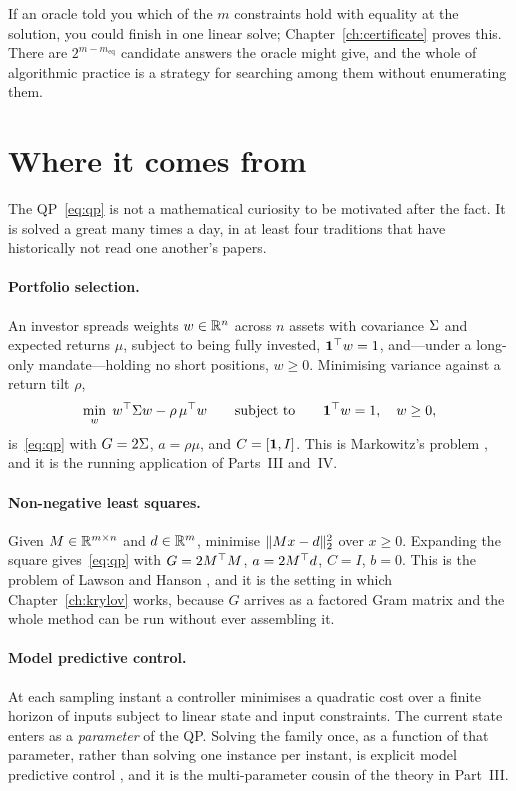 If an oracle told you which of the $m$ constraints hold with equality at the
solution, you could finish in one linear solve; Chapter~\ref{ch:certificate}
proves this. There are $2^{m-m_{\mathrm{eq}}}$ candidate answers the oracle might
give, and the whole of algorithmic practice is a strategy for searching among
them without enumerating them.

\section{Where it comes from}

The QP~\eqref{eq:qp} is not a mathematical curiosity to be motivated after the
fact. It is solved a great many times a day, in at least four traditions that
have historically not read one another's papers.

\paragraph{Portfolio selection.} An investor spreads weights $w \in \mathbb{R}^n$ across
$n$ assets with covariance $\Sigma$ and expected returns $\mu$, subject to being
fully invested, $\mathbf{1}^{\top} w = 1$, and---under a long-only mandate---holding no
short positions, $w \ge 0$. Minimising variance against a return tilt $\rho$,
\[
  \min_w \; w^{\top} \Sigma w - \rho\,\mu^{\top} w
  \qquad\text{subject to}\qquad \mathbf{1}^{\top} w = 1, \quad w \ge 0,
\]
is~\eqref{eq:qp} with $G = 2\Sigma$, $a = \rho\mu$, and $C = [\mathbf{1}, I]$. This is
Markowitz's problem \cite{markowitz1952}, and it is the running application of
Parts~III and~IV.

\paragraph{Non-negative least squares.} Given $M \in \mathbb{R}^{m\times n}$ and
$d \in \mathbb{R}^m$, minimise $\lVert Mx - d \rVert_2^2$ over $x \ge 0$. Expanding the square
gives~\eqref{eq:qp} with $G = 2M^{\top} M$, $a = 2M^{\top} d$, $C = I$, $b = 0$. This is
the problem of Lawson and Hanson \cite{lawson1974}, and it is the setting in
which Chapter~\ref{ch:krylov} works, because $G$ arrives as a factored
Gram matrix and the whole method can be run without ever assembling it.

\paragraph{Model predictive control.} At each sampling instant a controller
minimises a quadratic cost over a finite horizon of inputs subject to linear
state and input constraints. The current state enters as a \emph{parameter} of
the QP. Solving the family once, as a function of that parameter, rather than
solving one instance per instant, is explicit model predictive control
\cite{bemporad2002}, and it is the multi-parameter cousin of the theory in
Part~III.

